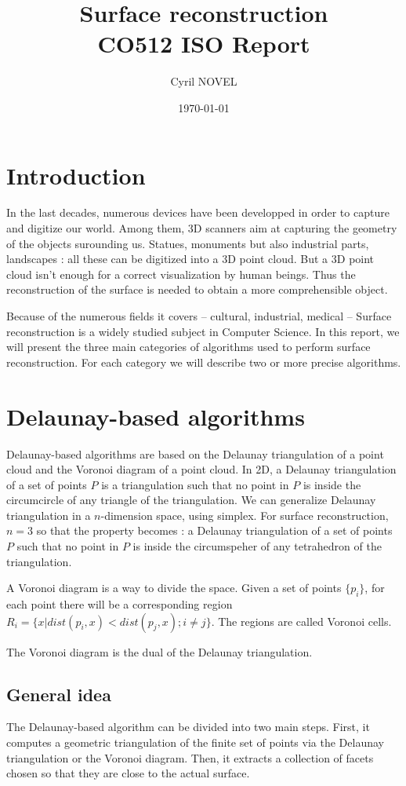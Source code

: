 \documentclass[a4paper]{article}
\title{Surface reconstruction\\
\large{CO512 ISO Report}}
\author{Cyril NOVEL}
\date{\today}
\begin{document}
\maketitle
\newpage

\section*{Introduction}
In the last decades, numerous devices have been developped in order to capture and digitize our world. Among them, 3D scanners aim at capturing the geometry of the objects surounding us. Statues, monuments but also industrial parts, landscapes : all these can be digitized into a 3D point cloud. But a 3D point cloud isn't enough for a correct visualization by human beings. Thus the reconstruction of the surface is needed to obtain a more comprehensible object.

Because of the numerous fields it covers -- cultural, industrial, medical -- Surface reconstruction is a widely studied subject in Computer Science. In this report, we will present the three main categories of algorithms used to perform surface reconstruction. For each category we will describe two or more precise algorithms.

\newpage

\section{Delaunay-based algorithms}
Delaunay-based algorithms are based on the Delaunay triangulation of a point cloud and the Voronoi diagram of a point cloud. In 2D, a Delaunay triangulation of a set of points $P$ is a triangulation such that no point in $P$ is inside the circumcircle of any triangle of the triangulation. We can generalize Delaunay triangulation in a $n$-dimension space, using simplex. For surface reconstruction, $n = 3$ so that the property becomes : a Delaunay triangulation of a set of points $P$ such that no point in $P$ is inside the circumspeher of any tetrahedron of the triangulation.

A Voronoi diagram is a way to divide the space. Given a set of points $\{p_i\}$,  for each point there will be a corresponding region $R_i = \{x | dist(p_i,x) < dist(p_j,x) ; i \ne j\}$. The regions are called Voronoi cells.

The Voronoi diagram is the dual of the Delaunay triangulation.

\subsection{General idea}
The Delaunay-based algorithm can be divided into two main steps. First, it computes a geometric triangulation of the finite set of points via the Delaunay triangulation or the Voronoi diagram. Then, it extracts a collection of facets chosen so that they are close to the actual surface.
\end{document}
